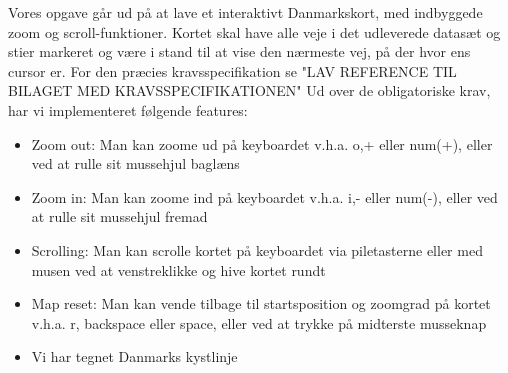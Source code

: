 Vores opgave går ud på at lave et interaktivt Danmarkskort, med indbyggede zoom og scroll-funktioner. Kortet skal have alle veje i det udleverede datasæt og stier markeret og være i stand til at vise den nærmeste vej, på der hvor ens cursor er. For den præcies kravsspecifikation se "LAV REFERENCE TIL BILAGET MED KRAVSSPECIFIKATIONEN"
\newline
Ud over de obligatoriske krav, har vi implementeret følgende features:
\begin{itemize}
\item{Zoom out: Man kan zoome ud på keyboardet v.h.a. o,+ eller num(+), eller ved at rulle sit mussehjul baglæns}
\item{Zoom in: Man kan zoome ind på keyboardet v.h.a. i,- eller num(-), eller ved at rulle sit mussehjul fremad}
\item{Scrolling: Man kan scrolle kortet på keyboardet via piletasterne eller med musen ved at venstreklikke og hive kortet rundt}
\item{Map reset: Man kan vende tilbage til startsposition og zoomgrad på kortet v.h.a. r, backspace eller space, eller ved at trykke på midterste musseknap}
\item{Vi har tegnet Danmarks kystlinje}
\end{itemize}